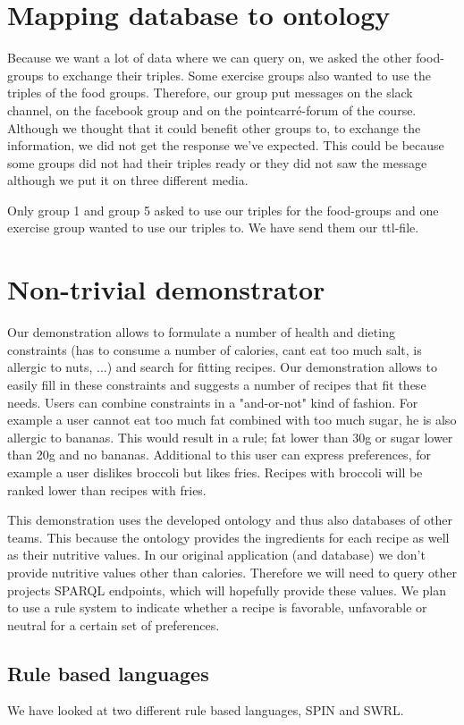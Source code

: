 \section{Mapping database to ontology}
Because we want a lot of data where we can query on, we asked the other food-groups to exchange their triples. Some exercise groups also wanted to use the triples of the food groups. Therefore, our group put messages on the slack channel, on the facebook group and on the pointcarré-forum of the course. Although we thought that it could benefit other groups to, to exchange the information, we did not get the response we've expected. This could be because some groups did not had their triples ready or they did not saw the message although we put it on three different media. 

Only group 1 and group 5 asked to use our triples for the food-groups and one exercise group wanted to use our triples to. We have send them our ttl-file. 
\section{Non-trivial demonstrator}
Our demonstration allows to formulate a number of health and dieting constraints (has to consume a number of calories, cant eat too much salt, is allergic to nuts, ...) and search for fitting recipes. Our demonstration allows to easily fill in these constraints and suggests a number of recipes that fit these needs. Users can combine constraints in a "and-or-not" kind of fashion. For example a user cannot eat too much fat combined with too much sugar, he is also allergic to bananas. This would result in a rule; fat lower than 30g or sugar lower than 20g and no bananas. Additional to this user can express preferences, for example a user dislikes broccoli but likes fries. Recipes with broccoli will be ranked lower than recipes with fries.

This demonstration uses the developed ontology and thus also databases of other teams. This because the ontology provides the ingredients for each recipe as well as their nutritive values. In our original application (and database) we don't provide nutritive values other than calories. Therefore we will need to query other projects SPARQL endpoints, which will hopefully provide these values. We plan to use a rule system to indicate whether a recipe is favorable, unfavorable or neutral for a certain set of preferences.
\subsection{Rule based languages}
We have looked at two different rule based languages, SPIN and SWRL. 

